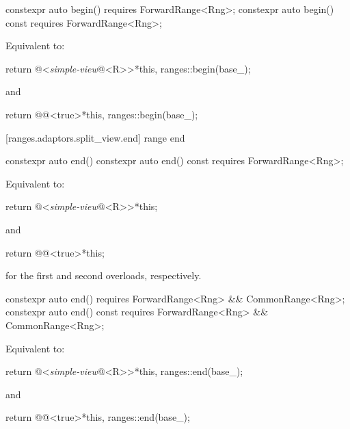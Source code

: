 %
\begin{itemdecl}
constexpr auto begin() requires ForwardRange<Rng>;
constexpr auto begin() const requires ForwardRange<Rng>;
\end{itemdecl}

\begin{itemdescr}
\pnum
\effects Equivalent to:
\begin{codeblock}
return @<\textit{simple-view}@<R>>{*this, ranges::begin(base_)};
\end{codeblock}
  and
\begin{codeblock}
return @@<true>{*this, ranges::begin(base_)};
\end{codeblock}
\end{itemdescr}

[ranges.adaptors.split_view.end]{ range end}

%
\begin{itemdecl}
constexpr auto end()
constexpr auto end() const requires ForwardRange<Rng>;
\end{itemdecl}

\begin{itemdescr}
\pnum
\effects Equivalent to:
\begin{codeblock}
return @<\textit{simple-view}@<R{>}>{*this};
\end{codeblock}
and
\begin{codeblock}
return @@<true>{*this};
\end{codeblock}
for the first and second overloads, respectively.
\end{itemdescr}

%
\begin{itemdecl}
constexpr auto end()
  requires ForwardRange<Rng> && CommonRange<Rng>;
constexpr auto end() const
  requires ForwardRange<Rng> && CommonRange<Rng>;
\end{itemdecl}

\begin{itemdescr}
\pnum
\effects Equivalent to:
\begin{codeblock}
return @<\textit{simple-view}@<R>>{*this, ranges::end(base_)};
\end{codeblock}
  and
\begin{codeblock}
return @@<true>{*this, ranges::end(base_)};
\end{codeblock}
\end{itemdescr}

